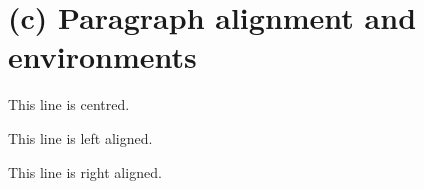 \documentclass{article}
\begin{document}
	\section*{(c) Paragraph alignment and environments}
	\begin{center} This line is centred. \end{center}
	\begin{flushleft} This line is left aligned. \end{flushleft}
	\begin{flushright} This line is right aligned. \end{flushright}
	
\end{document}
